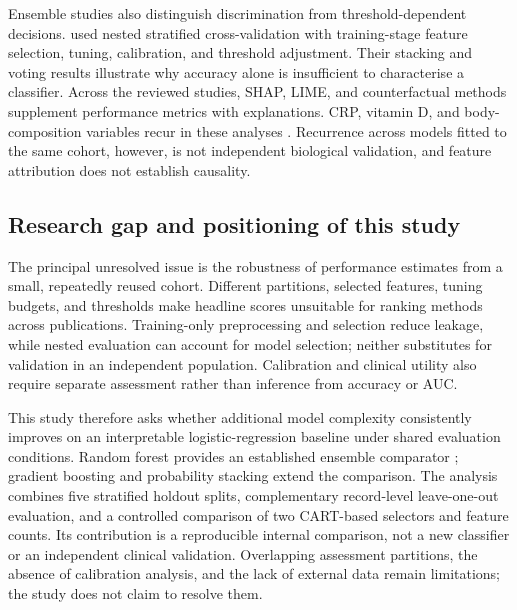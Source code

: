 Ensemble studies also distinguish discrimination from threshold-dependent decisions. \textcite{indirani2026ensemble} used nested stratified cross-validation with training-stage feature selection, tuning, calibration, and threshold adjustment. Their stacking and voting results illustrate why accuracy alone is insufficient to characterise a classifier. Across the reviewed studies, SHAP, LIME, and counterfactual methods supplement performance metrics with explanations. CRP, vitamin D, and body-composition variables recur in these analyses \parencite{esen2024early,shrestha2026metaheuristic,das2026sloa}. Recurrence across models fitted to the same cohort, however, is not independent biological validation, and feature attribution does not establish causality.

\subsection{Research gap and positioning of this study}
The principal unresolved issue is the robustness of performance estimates from a small, repeatedly reused cohort. Different partitions, selected features, tuning budgets, and thresholds make headline scores unsuitable for ranking methods across publications. Training-only preprocessing and selection reduce leakage, while nested evaluation can account for model selection; neither substitutes for validation in an independent population. Calibration and clinical utility also require separate assessment rather than inference from accuracy or AUC.

This study therefore asks whether additional model complexity consistently improves on an interpretable logistic-regression baseline under shared evaluation conditions. Random forest provides an established ensemble comparator \parencite{breiman2001randomforests}; gradient boosting and probability stacking extend the comparison. The analysis combines five stratified holdout splits, complementary record-level leave-one-out evaluation, and a controlled comparison of two CART-based selectors and feature counts. Its contribution is a reproducible internal comparison, not a new classifier or an independent clinical validation. Overlapping assessment partitions, the absence of calibration analysis, and the lack of external data remain limitations; the study does not claim to resolve them.
